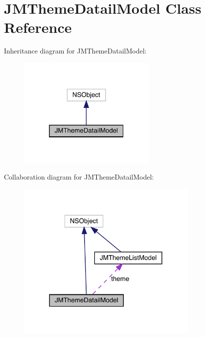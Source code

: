 \hypertarget{interface_j_m_theme_datail_model}{}\section{J\+M\+Theme\+Datail\+Model Class Reference}
\label{interface_j_m_theme_datail_model}


Inheritance diagram for J\+M\+Theme\+Datail\+Model\+:\nopagebreak
\begin{figure}[H]
\begin{center}
\leavevmode
\includegraphics[width=193pt]{interface_j_m_theme_datail_model__inherit__graph}
\end{center}
\end{figure}


Collaboration diagram for J\+M\+Theme\+Datail\+Model\+:\nopagebreak
\begin{figure}[H]
\begin{center}
\leavevmode
\includegraphics[width=252pt]{interface_j_m_theme_datail_model__coll__graph}
\end{center}
\end{figure}
